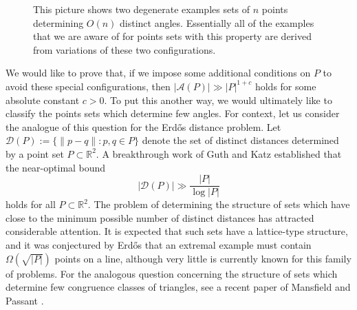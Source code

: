 \documentclass[11pt,oneside]{amsart}
\numberwithin{exercise}{subsection}
\begin{document}
\begin{figure}


\caption{This picture shows two degenerate examples sets of $n$ points determining $O(n)$ distinct angles. Essentially all of the examples that we are aware of for points sets with this property are derived from variations of these two configurations.}

\end{figure}



We would like to prove that, if we impose some additional conditions on $P$ to avoid these special configurations, then $|\mathcal A(P)| \gg |P|^{1+c}$ holds for some absolute constant $c>0$. To put this another way, we would ultimately like to classify the points sets which determine few angles. For context, let us consider the analogue of this question for the Erd\H{o}s distance problem. Let $\mathcal D(P):= \{ \| p - q\| :p,q \in P \}$ denote the set of distinct distances determined by a point set $P \subset \mathbb R^2$. A breakthrough work of Guth and Katz \cite{GK} established that the near-optimal bound
\[
| \mathcal D(P) | \gg \frac{|P| }{ \log |P|}
\]
holds for all $P \subset \mathbb R^2$. The problem of determining the structure of sets which have close to the minimum possible number of distinct distances has attracted considerable attention. It is expected that such sets have a lattice-type structure, and it was conjectured by Erd\H{o}s \cite{E} that an extremal example must contain $\Omega( \sqrt{|P|})$ points on a line, although very little is currently known for this family of problems. For the analogous question concerning the structure of sets which determine few congruence classes of triangles, see a recent paper of Mansfield and Passant \cite{MP}.
\end{document}
